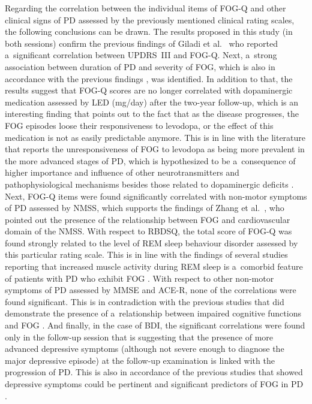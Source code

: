 Regarding the correlation between the individual items of FOG-Q and other clinical signs of PD assessed by the previously mentioned clinical rating scales, the following conclusions can be drawn. The results proposed in this study (in both sessions) confirm the previous findings of Giladi et al.~\cite{Giladi2000} who reported a~significant correlation between UPDRS~III and FOG-Q. Next, a~strong association between duration of PD and severity of FOG, which is also in accordance with the previous findings \cite{Macht2007, Nilsson2009, Shine2013}, was identified. In addition to that, the results suggest that FOG-Q scores are no longer correlated with dopaminergic medication assessed by LED (mg/day) after the two-year follow-up, which is an interesting finding that points out to the fact that as the disease progresses, the FOG episodes loose their responsiveness to levodopa, or the effect of this medication is not as easily predictable anymore. This is in line with the literature that reports the unresponsiveness of FOG to levodopa as being more prevalent in the more advanced stages of PD, which is hypothesized to be a~consequence of higher importance and influence of other neurotransmitters and pathophysiological mechanisms besides those related to dopaminergic deficits \cite{Espay2012, Vercruysse2014, Xiao2017}. Next, FOG-Q items were found significantly correlated with non-motor symptoms of PD assessed by NMSS, which supports the findings of Zhang et al.~\cite{Zhang2016}, who pointed out the presence of the relationship between FOG and cardiovascular domain of the NMSS. With respect to RBDSQ, the total score of FOG-Q was found strongly related to the level of REM sleep behaviour disorder assessed by this particular rating scale. This is in line with the findings of several studies reporting that increased muscle activity during REM sleep is a~comorbid feature of patients with PD who exhibit FOG \cite{Videnovic2013, Walton2015, Zhang2016}. With respect to other non-motor symptoms of PD assessed by MMSE and ACE-R, none of the correlations were found significant. This is in contradiction with the previous studies that did demonstrate the presence of a~relationship between impaired cognitive functions and FOG \cite{Rektorova2016, Yao2017}. And finally, in the case of BDI, the significant correlations were found only in the follow-up session that is suggesting that the presence of more advanced depressive symptoms (although not severe enough to diagnose the major depressive episode) at the follow-up examination is linked with the progression of PD. This is also in accordance of the previous studies that showed depressive symptoms could be pertinent and significant predictors of FOG in PD \cite{Giladi2001b, Shine2013, Walton2015}.

